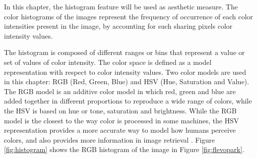 




In this chapter, the histogram feature will be used as aesthetic measure.
The color histograms of 
the images represent the frequency of occurrence of each color
intensities present in the image, by accounting for such sharing
pixels color intensity values. %

The histogram is composed of different ranges or bins that represent a value or set of values of color intensity. %
 The color space is defined as a model representation with respect to color intensity values. Two color models are used in this chapter: RGB (Red, Green, Blue) and HSV (Hue, Saturation and Value). The RGB model is an additive color model in which red, green and blue are added together in different proportions to reproduce a wide range of colors, while the HSV is based on hue or tone, saturation and brightness. While the RGB model is the closest to the way color is processed in some machines, the HSV representation provides a more accurate way to model how humans perceive colors, and also provides more information in image retrieval \cite{COLORDIFFERENCES}.
Figure \ref{fig:histogram} shows the RGB histogram of the image in Figure \ref{fig:flevopark}.

